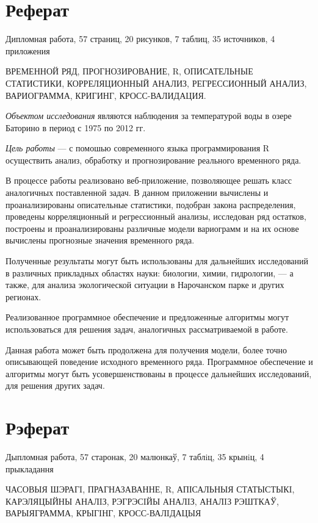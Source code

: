 \newpage

\chapter*{Реферат}
Дипломная работа, 57 страниц, 20 рисунков, 7 таблиц, 35 источников, 4 приложения

ВРЕМЕННОЙ РЯД, ПРОГНОЗИРОВАНИЕ, R, ОПИСАТЕЛЬНЫЕ СТАТИСТИКИ, КОРРЕЛЯЦИОННЫЙ АНАЛИЗ, РЕГРЕССИОННЫЙ АНАЛИЗ, ВАРИОГРАММА, КРИГИНГ, КРОСС-ВАЛИДАЦИЯ.

\textit{Объектом исследования} являются наблюдения за температурой воды в озере Баторино в период с 1975 по 2012 гг.

\textit{Цель работы} --- с помошью современного языка программирования R осуществить анализ, обработку и прогнозирование реального временного ряда.

В процессе работы реализовано веб-приложение, позволяющее решать класс аналогичных поставленной задач. В данном приложении вычислены и проанализированы описательные статистики, подобран закона распределения, проведены корреляционный и регрессионный анализы, исследован ряд остатков, построены и проанализированы различные модели вариограмм и на их основе вычислены прогнозные значения временного ряда.

Полученные результаты могут быть использованы для дальнейших исследований в различных прикладных областях науки: биологии, химии, гидрологии, --- а также, для анализа экологической ситуации в Нарочанском парке и других регионах.

Реализованное программное обеспечение и предложенные алгоритмы могут использоваться для решения задач, аналогичных рассматриваемой в работе.

Данная работа может быть продолжена для получения модели, более точно описывающей поведение исходного временного ряда. Программное обеспечение и алгоритмы могут быть усовершенствованы в процессе дальнейших исследований, для решения других задач.

\newpage

\chapter*{Рэферат}
Дыпломная работа, 57 старонак, 20 малюнкаў, 7 таблiц, 35 крынiц, 4 прыкладання

ЧАСОВЫЯ ШЭРАГI, ПРАГНАЗАВАННЕ, R, АПІСАЛЬНЫЯ СТАТЫСТЫКI, КАРЭЛЯЦЫЙНЫ АНАЛIЗ, РЭГРЭСIЙЫ АНАЛIЗ, АНАЛIЗ РЭШТКАЎ, ВАРЫЯГРАММА, КРЫГIНГ, КРОСС-ВАЛIДАЦЫЯ

